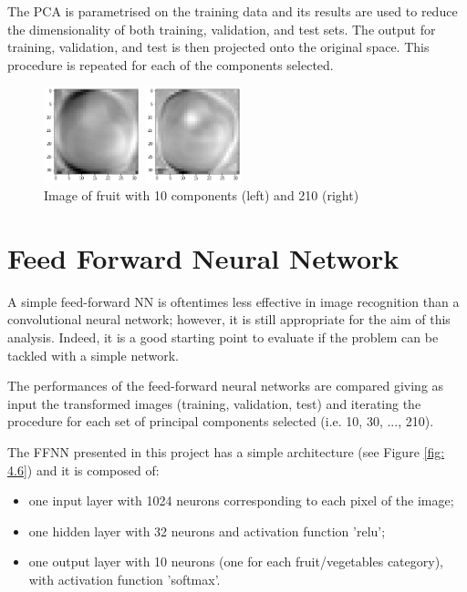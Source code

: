 \documentclass[10pt,english, openany]{book}
\begin{document}
The PCA is parametrised on the training data and its results are used to reduce the dimensionality of both training, validation, and test sets. The output for training, validation, and test is then projected onto the original space. This procedure is repeated for each of the components selected.

\begin{figure}[H]
  \centering
  \begin{minipage}[b]{0.48\textwidth}
    \centering
    \includegraphics[width=0.25\textwidth]{Images/1.4.1 PCA 10 components image.png}
  \end{minipage}
  \hfill
  \begin{minipage}[b]{0.48\textwidth}
    \centering
    \includegraphics[width=0.25\textwidth]{Images/1.4.2 PCA 210 components image.png}
  \end{minipage}
      \caption{Image of fruit with 10 components (left) and 210 (right)}

\end{figure}
\newpage
\section{Feed Forward Neural Network}
A simple feed-forward NN is oftentimes less effective in image recognition than a convolutional neural network; however, it is still appropriate for the aim of this analysis. Indeed, it is a good starting point to evaluate if the problem can be tackled with a simple network.

The performances of the feed-forward neural networks are compared giving as input the transformed images (training, validation, test) and iterating the procedure for each set of principal components selected (i.e. 10, 30, ..., 210).

The FFNN presented in this project has a simple architecture (see Figure \ref{fig: 4.6}) and it is composed of:
\begin{itemize}
    \item one input layer with 1024 neurons corresponding to each pixel of the image;
    \item one hidden layer with 32 neurons and activation function 'relu';
    \item one output layer with 10 neurons (one for each fruit/vegetables category), with activation function 'softmax'.
\end{itemize}
\end{document}
